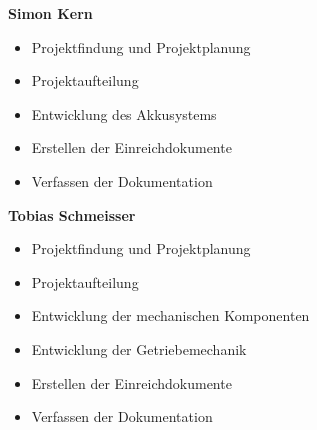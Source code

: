 \newpage

\textbf{Simon Kern}
\begin{itemize}
	\item Projektfindung und Projektplanung
	\item Projektaufteilung
	\item Entwicklung des Akkusystems
	\item Erstellen der Einreichdokumente
	\item Verfassen der Dokumentation
\end{itemize}
\bigskip

\textbf{Tobias Schmeisser}
\begin{itemize}
	\item Projektfindung und Projektplanung
	\item Projektaufteilung
	\item Entwicklung der mechanischen Komponenten
	\item Entwicklung der Getriebemechanik
	\item Erstellen der Einreichdokumente	
	\item Verfassen der Dokumentation
\end{itemize}